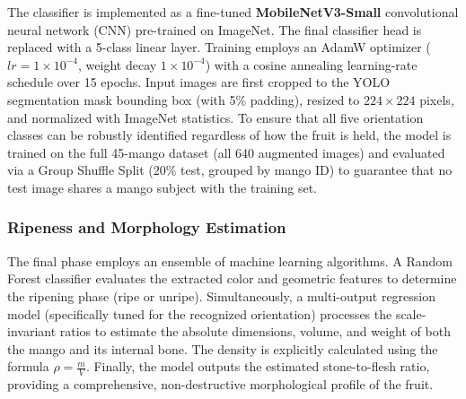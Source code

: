 The classifier is implemented as a fine-tuned \textbf{MobileNetV3-Small} convolutional neural network (CNN) pre-trained on ImageNet. The final classifier head is replaced with a 5-class linear layer. Training employs an AdamW optimizer ($lr=1\times10^{-4}$, weight decay $1\times10^{-4}$) with a cosine annealing learning-rate schedule over 15 epochs. Input images are first cropped to the YOLO segmentation mask bounding box (with 5\% padding), resized to $224\times224$ pixels, and normalized with ImageNet statistics. To ensure that all five orientation classes can be robustly identified regardless of how the fruit is held, the model is trained on the full 45-mango dataset (all 640 augmented images) and evaluated via a Group Shuffle Split ($20\%$ test, grouped by mango ID) to guarantee that no test image shares a mango subject with the training set.

\subsubsection{Ripeness and Morphology Estimation}
The final phase employs an ensemble of machine learning algorithms. A Random Forest classifier evaluates the extracted color and geometric features to determine the ripening phase (ripe or unripe). Simultaneously, a multi-output regression model (specifically tuned for the recognized orientation) processes the scale-invariant ratios to estimate the absolute dimensions, volume, and weight of both the mango and its internal bone. The density is explicitly calculated using the formula $\rho = \frac{m}{V}$. Finally, the model outputs the estimated stone-to-flesh ratio, providing a comprehensive, non-destructive morphological profile of the fruit.
